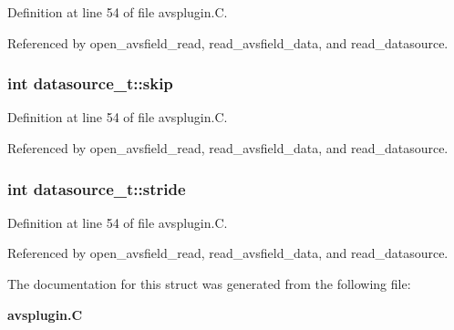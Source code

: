 Definition at line 54 of file avsplugin.C.

Referenced by open\_\-avsfield\_\-read, read\_\-avsfield\_\-data, and read\_\-datasource.
\subsubsection{\setlength{\rightskip}{0pt plus 5cm}int datasource\_\-t::skip}\label{structdatasource__t_m2}




Definition at line 54 of file avsplugin.C.

Referenced by open\_\-avsfield\_\-read, read\_\-avsfield\_\-data, and read\_\-datasource.
\subsubsection{\setlength{\rightskip}{0pt plus 5cm}int datasource\_\-t::stride}\label{structdatasource__t_m4}




Definition at line 54 of file avsplugin.C.

Referenced by open\_\-avsfield\_\-read, read\_\-avsfield\_\-data, and read\_\-datasource.

The documentation for this struct was generated from the following file:\begin{CompactItemize}
\item 
{\bf avsplugin.C}\end{CompactItemize}
